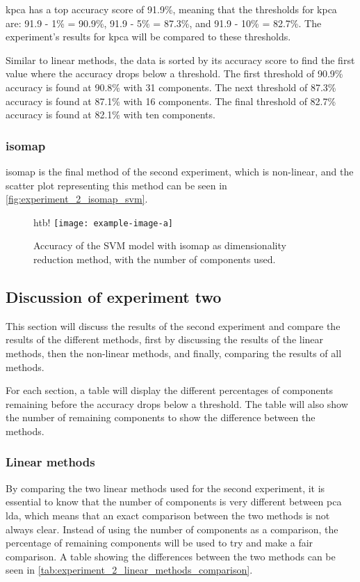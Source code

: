 \gls{kpca} has a top accuracy score of 91.9\%, meaning that the thresholds for \gls{kpca} are: 91.9 - 1\% = 90.9\%, 91.9 - 5\% = 87.3\%, and 91.9 - 10\% = 82.7\%. The experiment's results for \gls{kpca} will be compared to these thresholds.

Similar to linear methods, the data is sorted by its accuracy score to find the first value where the accuracy drops below a threshold. The first threshold of 90.9\% accuracy is found at 90.8\% with 31 components. The next threshold of 87.3\% accuracy is found at 87.1\% with 16 components. The final threshold of 82.7\% accuracy is found at 82.1\% with ten components.


\subsubsection{\gls{isomap}}\label{subsubsec:experiment_2_isomap}
\gls{isomap} is the final method of the second experiment, which is non-linear, and the scatter plot representing this method can be seen in \autoref{fig:experiment_2_isomap_svm}.

\begin{figure}{htb!}
    \centering
    \texttt{[image: example-image-a]}
    \caption{Accuracy of the SVM model with \gls{isomap} as dimensionality reduction method, with the number of components used.}
    \label{fig:experiment_2_isomap_svm}
\end{figure}



\subsection{Discussion of experiment two}\label{subsec:experiment_2_discussion}
This section will discuss the results of the second experiment and compare the results of the different methods, first by discussing the results of the linear methods, then the non-linear methods, and finally, comparing the results of all methods.

For each section, a table will display the different percentages of components remaining before the accuracy drops below a threshold. The table will also show the number of remaining components to show the difference between the methods.


\subsubsection{Linear methods}
By comparing the two linear methods used for the second experiment, it is essential to know that the number of components is very different between \gls{pca} \gls{lda}, which means that an exact comparison between the two methods is not always clear. Instead of using the number of components as a comparison, the percentage of remaining components will be used to try and make a fair comparison. A table showing the differences between the two methods can be seen in \autoref{tab:experiment_2_linear_methods_comparison}.

